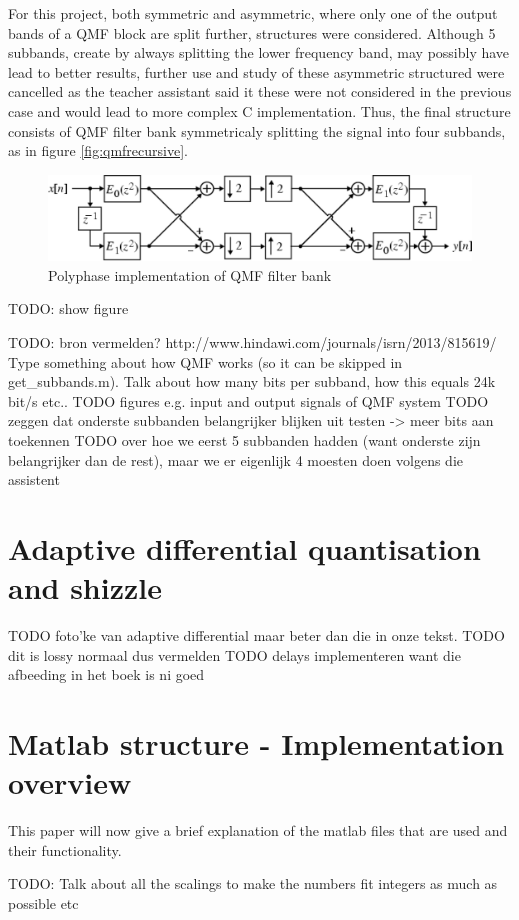 \documentclass[a4paper]{article}
\begin{document}
For this project, both symmetric and asymmetric, where only one of the output bands of a QMF block are split further, structures were considered. Although 5 subbands, create by always splitting the lower frequency band, may possibly have lead to better results, further use and study of these asymmetric structured were cancelled as the teacher assistant said it these were not considered in the previous case and would lead to more complex C implementation. Thus, the final structure consists of QMF filter bank symmetricaly splitting the signal into four subbands, as in figure \ref{fig:qmfrecursive}.
\begin{figure}[hbt]
\includegraphics[width = \textwidth]{qmf}
\caption{Polyphase implementation of QMF filter bank}
\label{fig:qmf}
\end{figure}

TODO: show figure

TODO: bron vermelden? http://www.hindawi.com/journals/isrn/2013/815619/
Type something about how QMF works (so it can be skipped in get\_subbands.m). Talk about how many bits per subband, how this equals 24k bit/s etc..
TODO figures e.g. input and output signals of QMF system
TODO zeggen dat onderste subbanden belangrijker blijken uit testen -> meer bits aan toekennen
TODO over hoe we eerst 5 subbanden hadden (want onderste zijn belangrijker dan de rest), maar we er eigenlijk 4 moesten doen volgens die assistent

\section{Adaptive differential quantisation and shizzle}
TODO foto'ke van adaptive differential maar beter dan die in onze tekst.
TODO dit is lossy normaal dus vermelden
TODO delays implementeren want die afbeeding in het boek is ni goed 

\section{Matlab structure - Implementation overview}
This paper will now give a brief explanation of the matlab files that are used and their functionality.

TODO: Talk about all the scalings to make the numbers fit integers as much as possible etc
\end{document}
